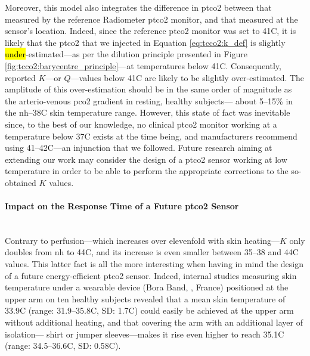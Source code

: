 Moreover, this model also integrates the difference in \gls{ptco2} between that measured by the reference Radiometer \gls{ptco2} monitor, and that measured at the sensor's location. Indeed, since the reference \gls{ptco2} monitor was set to 41{\degree}C, it is likely that the \gls{ptco2} that we injected in Equation \ref{eq:tcco2:k_def} is slightly \hl{under}-estimated---as per the dilution principle presented in Figure \ref{fig:tcco2:barycentre_principle}---at temperatures below 41{\degree}C. Consequently, reported $K$---or $Q$---values below 41{\degree}C are likely to be slightly over-estimated. The amplitude of this over-estimation should be in the same order of magnitude as the arterio-venous \gls{pco2} gradient in resting, healthy subjects---\ie{} about 5--15\% in the \gls{nh}--38{\degree}C skin temperature range\cite{kowalchuk1988, schneider2013}. \mfrin{}However, this state of fact was inevitable since, to the best of our knowledge, no clinical \gls{ptco2} monitor working at a temperature below 37{\degree}C exists at the time being, and manufacturers recommend using 41--42{\degree}C---an injunction that we followed. Future research aiming at extending our work may consider the design of a \gls{ptco2} sensor working at low temperature in order to be able to perform the appropriate corrections to the so-obtained $K$ values.

\paragraph{Impact on the Response Time of a Future \texorpdfstring{\gls{ptco2}}{tcpCO2} Sensor}\label{subsect:tcco2:future_rt}\mbox{}\\

Contrary to perfusion---which increases over elevenfold with skin heating---$K$ only doubles from \gls{nh} to 44{\degree}C, and its increase is even smaller between 35--38 and 44{\degree}C values. This latter fact is all the more interesting when having in mind the design of a future energy-efficient \gls{ptco2} sensor. Indeed, internal studies measuring skin temperature under a wearable device (Bora Band, \bscy{}, France) positioned at the upper arm on ten healthy subjects revealed that a mean skin temperature of 33.9{\degree}C (range: 31.9--35.8{\degree}C, SD: 1.7{\degree}C) could easily be achieved at the upper arm without additional heating, and that covering the arm with an additional layer of isolation---\ie{} shirt or jumper sleeves---makes it rise even higher to reach 35.1{\degree}C (range: 34.5--36.6{\degree}C, SD: 0.58{\degree}C).

